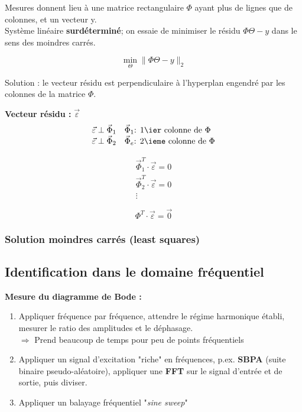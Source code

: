 \documentclass[document.tex]{subfiles}
\begin{document}
Mesures donnent lieu à une matrice rectangulaire $\Phi$ ayant plus de lignes que de colonnes, et un vecteur y.\\

Système linéaire \textbf{surdéterminé}; on essaie de minimiser le résidu $\Phi \Theta - y$ dans le sens des moindres carrés.

$$
\boxed{\underset{\Theta}{\min} \parallel \Phi \Theta - y \parallel_2}
$$


Solution : le vecteur résidu est perpendiculaire à l'hyperplan engendré
par les colonnes de la matrice $\Phi$.



\textbf{Vecteur résidu :} $\vec{\varepsilon}$\\

$$
\begin{array}{l l}
\vec{\varepsilon} \perp \vec{\Phi}_1 & \vec{\Phi}_1 \text{: 1\er colonne de }\Phi  \\
\vec{\varepsilon} \perp \vec{\Phi}_2 & \vec{\Phi}_e \text{: 2\eme colonne de }\Phi 
\end{array}
$$

$$
\begin{array}{c}
\vec{\Phi}_1^T \cdot \vec{\varepsilon} = 0 \\
\vec{\Phi}_2^T \cdot \vec{\varepsilon} = 0 \\
\vdots
\end{array}
$$

$$
\boxed {\Phi^T \cdot \vec{\varepsilon} = \vec{0}}
$$

\subsubsection{Solution moindres carrés (least squares)}


\subsection{Identification dans le domaine fréquentiel}

\textbf{Mesure du diagramme de Bode :}\\
\begin{enumerate}
\item Appliquer fréquence par fréquence, attendre le régime harmonique établi, mesurer le ratio des amplitudes et le déphasage. \\
$\Longrightarrow$ Prend beaucoup de temps pour peu de points fréquentiels
\item Appliquer un signal d'excitation "riche" en fréquences, p.ex. \textbf{SBPA} (suite binaire pseudo-aléatoire), appliquer une \textbf{FFT} sur le signal d'entrée et de sortie, puis diviser.
\item Appliquer un balayage fréquentiel "\textit{sine sweep}"
\end{enumerate}
\end{document}

